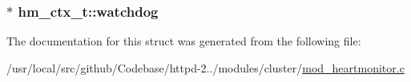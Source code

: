 \subsubsection[{\texorpdfstring{watchdog}{watchdog}}]{$\ast$ hm\+\_\+ctx\+\_\+t\+::watchdog}\hypertarget{structhm__ctx__t_ab11784488afa998d8e53024f60202bbd}{}\label{structhm__ctx__t_ab11784488afa998d8e53024f60202bbd}


The documentation for this struct was generated from the following file\+:\begin{DoxyCompactItemize}
\item 
/usr/local/src/github/\+Codebase/httpd-\/2../modules/cluster/\hyperlink{mod__heartmonitor_8c}{mod\+\_\+heartmonitor.\+c}\end{DoxyCompactItemize}
